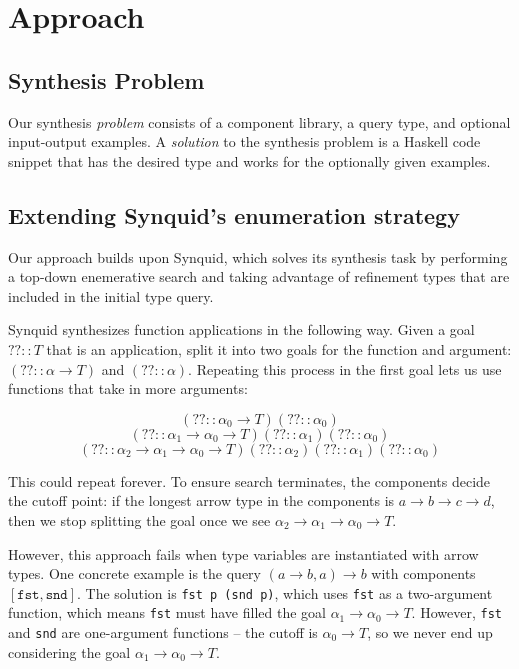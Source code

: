 \documentclass[acmsmall,nonacm]{acmart}
\begin{document}
\section{Approach}
\label{approach}



\subsection{Synthesis Problem}

Our synthesis \textit{problem} consists of a component library, a query type,
and optional input-output examples. A \textit{solution} to the synthesis 
problem is a Haskell code snippet that has the desired type and works 
for the optionally given examples.


\subsection{Extending Synquid's enumeration strategy} 

Our approach builds upon Synquid, which solves its synthesis task 
by performing a top-down enemerative search and taking advantage of
refinement types that are included in the initial type query. 

Synquid synthesizes function applications in the following way. 
Given a goal $?? :: T$ that is an application, split it into two 
goals for the function and argument: $(?? :: \alpha \to T)$ and 
$(?? :: \alpha)$. Repeating this process in the first goal lets us 
use functions that take in more arguments:

\[ (?? :: \alpha_0 \to T) (?? :: \alpha_0) \]
\[ (?? :: \alpha_1 \to \alpha_0 \to T) (?? :: \alpha_1) (?? :: \alpha_0) \]
\[ (?? :: \alpha_2 \to \alpha_1 \to \alpha_0 \to T) (?? :: \alpha_2) (?? :: \alpha_1) (?? :: \alpha_0) \]

This could repeat forever. To ensure search terminates, the components 
decide the cutoff point: if the longest arrow type in the components is 
$a \to b \to c \to d$, then we stop splitting the goal once we see 
$\alpha_2 \to \alpha_1 \to \alpha_0 \to T$.

However, this approach fails when type variables are instantiated with 
arrow types. One concrete example is the query $(a \to b, a) \to b$ 
with components $[\texttt{fst}, \texttt{snd}]$. The solution is 
\texttt{fst p (snd p)}, which uses \texttt{fst} as a two-argument function, 
which means \texttt{fst} must have filled the goal $\alpha_1 \to \alpha_0 \to T$. 
However, \texttt{fst} and \texttt{snd} are one-argument functions -- 
the cutoff is $\alpha_0 \to T$, so we never end up considering the goal 
$\alpha_1 \to \alpha_0 \to T$.
\end{document}
